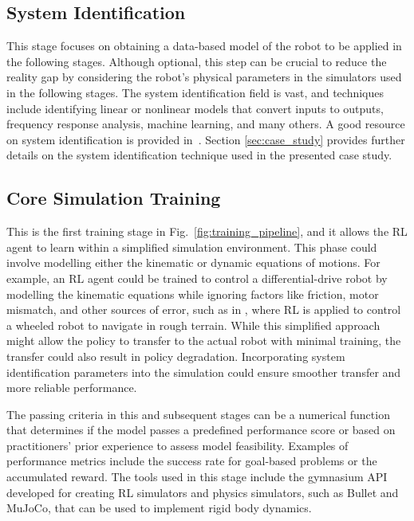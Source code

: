 
\subsection{System Identification}

This stage focuses on obtaining a data-based model of the robot to be applied in the following stages. Although optional, this step can be crucial to reduce the reality gap by considering the robot's physical parameters in the simulators used in the following stages. The system identification field is vast, and techniques include identifying linear or nonlinear models that convert inputs to outputs, frequency response analysis, machine learning, and many others. %
A good resource on system identification is provided in~\cite{brunton2022data}. Section \ref{sec:case_study} provides further details on the system identification technique used in the presented case study. 

\subsection{Core Simulation Training}

This is the first training stage in Fig.\ \ref{fig:training_pipeline}, and it allows the RL agent to learn within a simplified simulation environment. This phase could involve modelling either the kinematic or dynamic equations of motions. For example, an RL agent could be trained to control a differential-drive robot by modelling the kinematic equations while ignoring factors like friction, motor mismatch, and other sources of error, such as in \cite{hu2021sim}, where RL is applied to control a wheeled robot to navigate in rough terrain. While this simplified approach might allow the policy to transfer to the actual robot with minimal training, the transfer could also result in policy degradation. Incorporating system identification parameters into the simulation could ensure smoother transfer and more reliable performance.


The passing criteria in this and subsequent stages can be a numerical function that determines if the model passes a predefined performance score or based on practitioners' prior experience to assess model feasibility. Examples of performance metrics include the success rate for goal-based problems or the accumulated reward.
The tools used in this stage include the gymnasium API developed for creating RL simulators and physics simulators, such as Bullet and MuJoCo, that can be used to implement rigid body dynamics.

